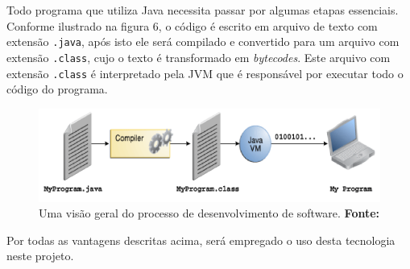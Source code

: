 

\par Todo programa que utiliza Java necessita passar por algumas etapas essenciais. Conforme ilustrado na figura 6, o código é escrito em arquivo de texto com extensão \texttt{.java}, após isto ele será compilado e convertido para um arquivo com extensão \texttt{.class}, cujo o texto é transformado em \textit{bytecodes}. Este arquivo com extensão \texttt{.class} é interpretado pela JVM que é responsável por executar todo o código do programa.

\begin{figure}[h!]
	\centerline{\includegraphics[scale=1]{./imagens/processo_compilacao_java.png}}
	\caption[Uma visão geral do processo de desenvolvimento de software.]
	{Uma visão geral do processo de desenvolvimento de software. \textbf{Fonte:} }
	\label{fig:exemplo1}
\end{figure}

\par Por todas as vantagens descritas acima, será empregado o uso desta tecnologia neste projeto.
